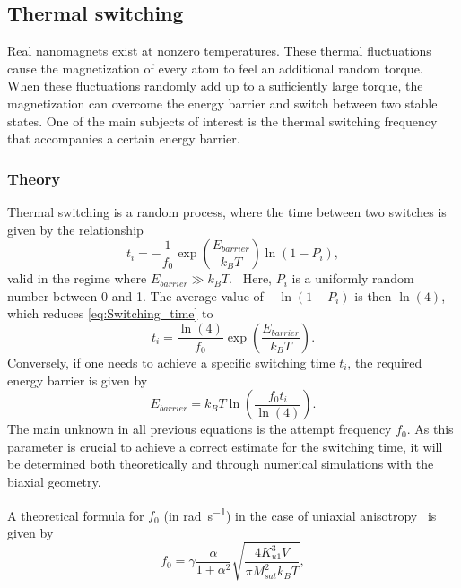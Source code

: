 \documentclass[11pt,a4paper,english]{article}
\begin{document}
\subsection{Thermal switching}
Real nanomagnets exist at nonzero temperatures. These thermal fluctuations cause the magnetization of every atom to feel an additional random torque. When these fluctuations randomly add up to a sufficiently large torque, the magnetization can overcome the energy barrier and switch between two stable states. One of the main subjects of interest is the thermal switching frequency that accompanies a certain energy barrier.

\subsubsection{Theory}
Thermal switching is a random process, where the time between two switches is given by the relationship
\begin{equation}
    t_i = -\frac{1}{f_0} \exp(\frac{E_{barrier}}{k_B T}) \ln(1-P_i) \mathrm{,}
    \label{eq:Switching_time}
\end{equation}
valid in the regime where $E_{barrier} \gg k_B T$.~\cite{GYP-18} Here, $P_i$ is a uniformly random number between 0 and 1. The average value of $-\ln(1-P_i)$ is then $\ln(4)$, which reduces \cref{eq:Switching_time} to
\begin{equation}
    t_i = \frac{\ln(4)}{f_0} \exp(\frac{E_{barrier}}{k_B T})  \mathrm{.}
    \label{eq:Switching_time_average}
\end{equation}
Conversely, if one needs to achieve a specific switching time $t_i$, the required energy barrier is given by
\begin{equation}
    E_{barrier} = k_B T \ln(\frac{f_0 t_i}{\ln(4)}) \mathrm{.}
\end{equation}
The main unknown in all previous equations is the attempt frequency $f_0$. As this parameter is crucial to achieve a correct estimate for the switching time, it will be determined both theoretically and through numerical simulations with the biaxial geometry. \par
A theoretical formula for $f_0$ (in \si{\radian\per\second}) in the case of uniaxial anisotropy~\cite{MuMax3, LEL-17b, f0_mumax3_reference} is given by
\begin{equation}
    f_0 = \gamma \frac{\alpha}{1+\alpha^2} \sqrt{\frac{4 K_{u1}^3 V}{\pi M_{sat}^2 k_B T}} \mathrm{,}
    \label{eq:f0_theoretical_uniaxial}
\end{equation}
\end{document}
